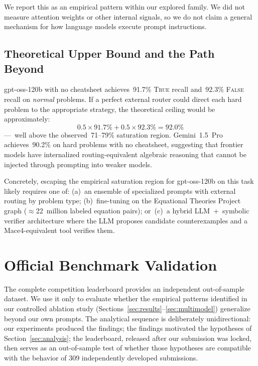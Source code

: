 \documentclass[11pt]{article}
\begin{document}
We report this as an empirical pattern within our explored family. We
did not measure attention weights or other internal signals, so we do
not claim a general mechanism for how language models execute prompt
instructions.

\subsection{Theoretical Upper Bound and the Path Beyond}

gpt-oss-120b with no cheatsheet achieves~91.7\% \textsc{True} recall
and~92.3\% \textsc{False} recall on \emph{normal} problems. If a
perfect external router could direct each hard problem to the
appropriate strategy, the theoretical ceiling would be approximately:
\[
  0.5 \times 91.7\% + 0.5 \times 92.3\% = 92.0\%
\]
---~well above the observed~71--79\% saturation region. Gemini~1.5~Pro
achieves~90.2\% on hard problems with no cheatsheet, suggesting that
frontier models have internalized routing-equivalent algebraic reasoning
that cannot be injected through prompting into weaker models.

Concretely, escaping the empirical saturation region for gpt-oss-120b
on this task likely requires one of:
(a)~an ensemble of specialized prompts with external routing by problem
type; (b)~fine-tuning on the Equational Theories Project graph
($\approx$22~million labeled equation pairs); or~(c)~a hybrid
LLM~+~symbolic verifier architecture where the LLM proposes candidate
counterexamples and a Mace4-equivalent tool verifies them.

\section{Official Benchmark Validation}
\label{sec:official}

The complete competition leaderboard provides an independent out-of-sample
dataset. We use it only to evaluate whether the empirical patterns
identified in our controlled ablation study
(Sections~\ref{sec:results}--\ref{sec:multimodel}) generalize beyond our
own prompts. The analytical sequence is deliberately unidirectional: our
experiments produced the findings; the findings motivated the hypotheses
of Section~\ref{sec:analysis}; the leaderboard, released after our
submission was locked, then serves as an out-of-sample test of whether
those hypotheses are compatible with the behavior of 309 independently
developed submissions.
\end{document}
